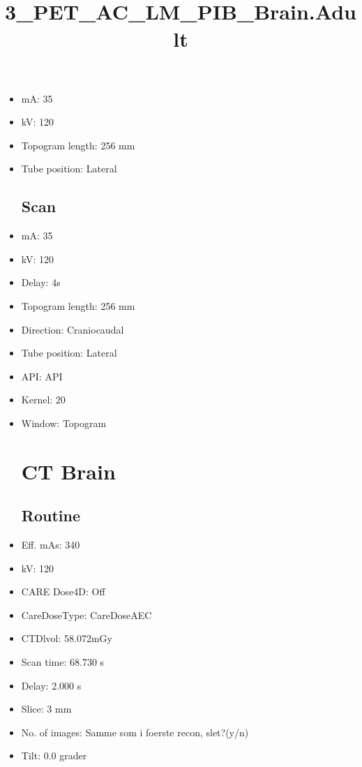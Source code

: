 \documentclass[12pt]{article}
\title{3\_PET\_AC\_LM\_PIB\_Brain.Adult}
\begin{document}
\maketitle
\newpage
\tableofcontents
\newpage
{}


\begin{itemize}\section{Topogram}
\subsection{Routine}
\item mA: 35\item kV: 120\item Topogram length: 256 mm\item Tube position: Lateral
\subsection{Scan}\item mA: 35\item kV: 120\item Delay: 4s\item Topogram length: 256 mm\item Direction: Craniocaudal\item Tube position: Lateral\item API: API \item Kernel: 20\item Window: Topogram
\section{CT Brain}
\subsection{Routine}
\item Eff. mAs: 340\item kV: 120\item CARE Dose4D: Off\item CareDoseType: CareDoseAEC\item CTDlvol: 58.072mGy\item Scan time: 68.730 s\item Delay: 2.000 s\item Slice: 3 mm\item No. of images: Samme som i foerste recon, slet?(y/n)\item Tilt: 0.0 grader

\end{itemize}
\end{document}
